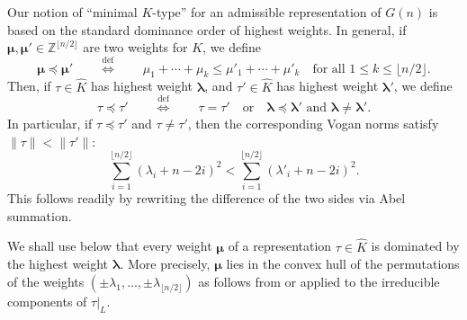 \documentclass[11pt,oneside]{amsart}
\numberwithin{equation}{section}
\theoremstyle{remark}
\theoremstyle{plain}
\newcommand\ZZ{\mathbb{Z}}
\renewcommand\leq{\leqslant}
\begin{document}
Our notion of ``minimal $K$-type'' for an admissible representation of $G(n)$ is based on the standard dominance order of highest weights. In general, if $\bm{\mu},\bm{\mu}'\in\ZZ^{\lfloor n/2\rfloor}$ are two weights for $K$, we define
\begin{equation}\label{eq:standard-dominance}
\bm{\mu}\preceq\bm{\mu}'\qquad\overset{\text{def}}{\Longleftrightarrow}\qquad
\mu_1+\dotsb+\mu_k\leq\mu'_1+\dotsb+\mu'_k\quad\text{for all $1\leq k\leq\lfloor n/2\rfloor$}.
\end{equation}
Then, if $\tau\in\widehat{K}$ has highest weight $\bm{\lambda}$, and $\tau'\in\widehat{K}$ has highest weight $\bm{\lambda}'$, we define
\[\tau\preceq\tau'\qquad\overset{\text{def}}{\Longleftrightarrow}\qquad
\tau=\tau'\quad\text{or}\quad\text{$\bm{\lambda}\preceq\bm{\lambda}'$ and $\bm{\lambda}\neq\bm{\lambda}'$}.\]
In particular, if $\tau\preceq\tau'$ and $\tau\neq\tau'$, then the corresponding Vogan norms \cite[Def.~5.4.18]{Vogan} satisfy $\|\tau\|<\|\tau'\|$:
\[\sum_{i=1}^{\lfloor n/2\rfloor}(\lambda_i+n-2i)^2<\sum_{i=1}^{\lfloor n/2\rfloor}(\lambda'_i+n-2i)^2.\]
This follows readily by rewriting the difference of the two sides via Abel summation.

We shall use below that every weight $\bm{\mu}$ of a representation $\tau\in\widehat{K}$ is dominated by the highest weight $\bm{\lambda}$. More precisely, $\bm{\mu}$ lies in the convex hull of the permutations of the weights $(\pm\lambda_1,\dotsc,\pm\lambda_{\lfloor{n/2}\rfloor})$ as follows from \cite[Th.~7.41]{Hall} or \cite[Prop.~2.2]{KLV} applied to the irreducible components of $\tau|_L$.
\end{document}
